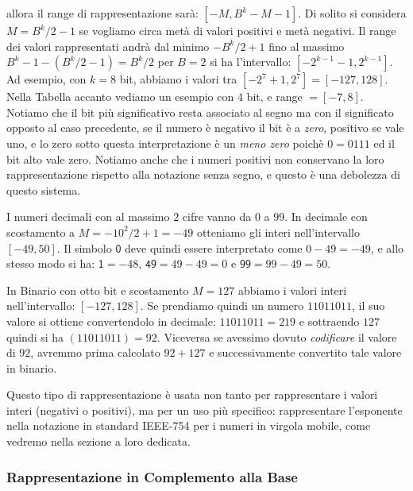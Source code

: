 \noindent allora il range di rappresentazione sarà: $[-M,B^k-M-1]$. Di solito
si considera $M = B^k/2-1$ se vogliamo circa metà di valori positivi e metà negativi. Il range dei valori rappresentati andrà dal minimo $-B^k/2+1$ fino al massimo $B^k-1-(B^k/2-1) = B^k/2$ per $B=2$ si ha l'intervallo: $[-2^{k-1}-1,2^{k-1}]$. Ad esempio, con $k = 8$ bit, abbiamo i valori tra $[-2^7+1,2^7] = [-127,128]$. Nella Tabella accanto vediamo un esempio con $4$ bit, e range $= [-7,8]$. Notiamo che il bit più significativo resta associato
al segno ma con il significato opposto al caso precedente, se il numero è negativo il bit è a \emph{zero}, positivo se vale uno, e lo zero sotto questa interpretazione è un \emph{meno zero} poichè $0 = 0111$ ed il bit alto vale zero. Notiamo anche che i numeri positivi non conservano la loro rappresentazione rispetto alla notazione senza segno, e questo è una debolezza di questo sistema.


\begin{ex} I numeri decimali con al massimo $2$ cifre vanno da $0$ a $99$. In decimale con scostamento a $M = -10^2/2 + 1 = -49$ otteniamo gli interi nell'intervallo $[-49,50]$. Il simbolo $\mathsf 0$ deve quindi essere interpretato come $0-49 = -49$, e allo stesso modo si ha: $\mathsf{1} = -48$, $\mathsf{49} = 49 - 49 = 0$ e $\mathsf{99} = 99 - 49 = 50$.

In Binario con otto bit e scostamento $M = 127$ abbiamo i valori interi nell'intervallo: $[-127,128]$. Se prendiamo quindi un numero $11011011$, il suo valore si ottiene convertendolo in decimale:
$11011011 = 219$ e sottraendo $127$ quindi si ha $(11011011) = 92$. Viceversa se avessimo dovuto \emph{codificare} il valore di $92$, avremmo prima calcolato $92+127$ e successivamente convertito tale valore in binario.
\end{ex}	

Questo tipo di rappresentazione è usata non tanto per rappresentare i valori interi (negativi o positivi), ma per un uso più specifico: rappresentare l'esponente nella notazione in standard \textrm{IEEE-754} per i numeri in virgola mobile, come vedremo nella sezione a loro dedicata.

\subsubsection{Rappresentazione in Complemento alla Base}

